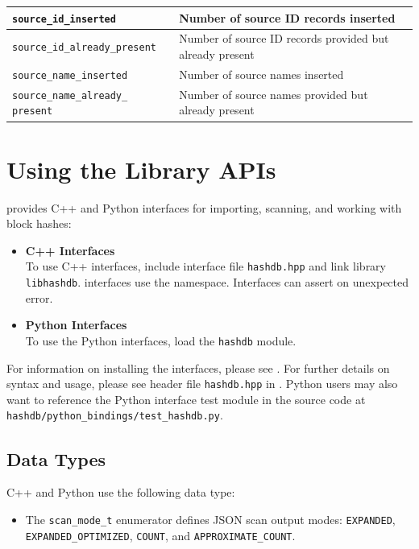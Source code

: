 \documentclass[11pt,fleqn]{article} %
\begin{document}
\begin{table}[!ht]
\begin{tabular}{|p{5 cm}|p{8.8 cm}|}
\verb+source_id_inserted+ &  Number of source ID records inserted\\
\hline
\verb+source_id_already_present+ &  Number of source ID records provided but already present\\
\hline

\verb+source_name_inserted+ &  Number of source names inserted\\
\hline
\verb+source_name_already_+ \verb+present+ &  Number of source names provided but already present\\
\hline
\end{tabular}
\end{table}

\section{Using the \hdb Library APIs}
\label{APIs}
\hdb provides C++ and Python interfaces for importing, scanning, and working with block hashes:

\begin{itemize}
\item \textbf{C++ Interfaces}\\
To use C++ interfaces, include interface file \verb+hashdb.hpp+ and link \hdb library \verb+libhashdb+. \hdb interfaces use the \hdb namespace. Interfaces can assert on unexpected error.
\item \textbf{Python Interfaces}\\
To use the Python interfaces, load the \verb+hashdb+ module.
\end{itemize}

For information on installing the \hdb interfaces, please see \textbf{}.  For further details on syntax and usage, please see \hdb header file \texttt{hashdb.hpp} in \textbf{}. Python users may also want to reference the Python interface test module in the source code at \verb+hashdb/python_bindings/test_hashdb.py+.\\

\subsection{Data Types}

C++ and Python use the following data type:
\begin{itemize}
\item The \verb+scan_mode_t+ enumerator defines JSON scan output modes: \verb+EXPANDED+, \verb+EXPANDED_OPTIMIZED+, \verb+COUNT+, and \verb+APPROXIMATE_COUNT+.
\end{itemize}
\end{document}
